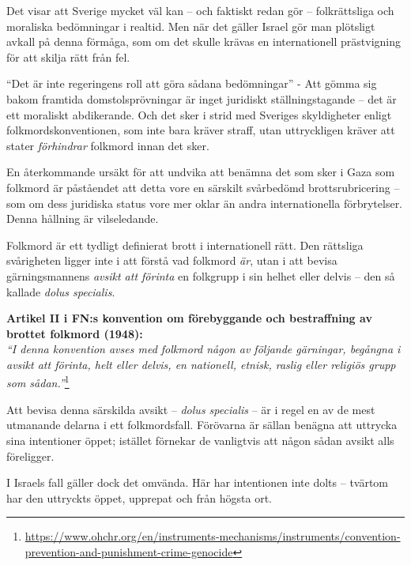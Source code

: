 Det visar att Sverige mycket väl kan – och faktiskt redan gör – folkrättsliga och moraliska bedömningar i realtid. Men när det gäller Israel gör man plötsligt avkall på denna förmåga, som om det skulle krävas en internationell prästvigning för att skilja rätt från fel.

``Det är inte regeringens roll att göra sådana bedömningar'' - Att gömma sig bakom framtida domstolsprövningar är inget juridiskt ställningstagande – det är ett moraliskt abdikerande. Och det sker i strid med Sveriges skyldigheter enligt folkmordskonventionen, som inte bara kräver straff, utan uttryckligen kräver att stater \textit{förhindrar} folkmord innan det sker.





En återkommande ursäkt för att undvika att benämna det som sker i Gaza som folkmord är påståendet att detta vore en särskilt svårbedömd brottsrubricering – som om dess juridiska status vore mer oklar än andra internationella förbrytelser. Denna hållning är vilseledande.

Folkmord är ett tydligt definierat brott i internationell rätt. Den rättsliga svårigheten ligger inte i att förstå vad folkmord \textit{är}, utan i att bevisa gärningsmannens \textit{avsikt att förinta} en folkgrupp i sin helhet eller delvis – den så kallade \textit{dolus specialis}.

\textbf{Artikel II i FN:s konvention om förebyggande och bestraffning av brottet folkmord (1948):}\\
\textit{“I denna konvention avses med folkmord någon av följande gärningar, begångna i avsikt att förinta, helt eller delvis, en nationell, etnisk, raslig eller religiös grupp som sådan.”}\footnote{\url{https://www.ohchr.org/en/instruments-mechanisms/instruments/convention-prevention-and-punishment-crime-genocide}}

Att bevisa denna särskilda avsikt – \textit{dolus specialis} – är i regel en av de mest utmanande delarna i ett folkmordsfall. Förövarna är sällan benägna att uttrycka sina intentioner öppet; istället förnekar de vanligtvis att någon sådan avsikt alls föreligger. 

I Israels fall gäller dock det omvända. Här har intentionen inte dolts – tvärtom har den uttryckts öppet, upprepat och från högsta ort.

